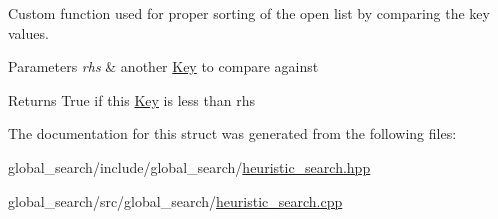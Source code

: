 Custom function used for proper sorting of the open list by comparing the key values. 


\begin{DoxyParams}{Parameters}
{\em rhs} & another \hyperlink{structhsearch_1_1Key}{Key} to compare against \\
\hline
\end{DoxyParams}
\begin{DoxyReturn}{Returns}
True if this \hyperlink{structhsearch_1_1Key}{Key} is less than rhs 
\end{DoxyReturn}


The documentation for this struct was generated from the following files\+:\begin{DoxyCompactItemize}
\item 
global\+\_\+search/include/global\+\_\+search/\hyperlink{heuristic__search_8hpp}{heuristic\+\_\+search.\+hpp}\item 
global\+\_\+search/src/global\+\_\+search/\hyperlink{heuristic__search_8cpp}{heuristic\+\_\+search.\+cpp}\end{DoxyCompactItemize}
